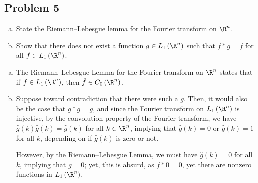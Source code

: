\documentclass[10pt]{mypackage}
\begin{document}
\subsection{Problem 5}%
\begin{problem}\hfill
  \begin{enumerate}[(a)]
    \item State the Riemann--Lebesgue lemma for the Fourier transform on $\R^n$.
    \item Show that there does not exist a function $g\in L_1\left( \R^n \right)$ such that $f\ast g = f$ for all $f\in L_1\left( \R^n \right)$.
  \end{enumerate}
\end{problem}
\begin{enumerate}[(a)]
  \item The Riemann--Lebesgue Lemma for the Fourier transform on $\R^n$ states that if $f\in L_1\left( \R^n \right)$, then $\hat{f}\in C_0\left( \R^n \right)$.
  \item Suppose toward contradiction that there were such a $g$. Then, it would also be the case that $g\ast g = g$, and since the Fourier transform on $L_1\left( \R^n \right)$ is injective, by the convolution property of the Fourier transform, we have $\hat{g}(k)\hat{g}(k) = \hat{g}(k)$ for all $k\in \R^n$, implying that $\hat{g}(k) = 0$ or $\hat{g}(k) = 1$ for all $k$, depending on if $\hat{g}(k)$ is zero or not.\newline

    However, by the Riemann--Lebesgue Lemma, we must have $\hat{g}(k) = 0$ for all $k$, implying that $g = 0$; yet, this is absurd, as $f\ast 0 = 0$, yet there are nonzero functions in $L_1\left( \R^n \right)$.
\end{enumerate}
\end{document}
